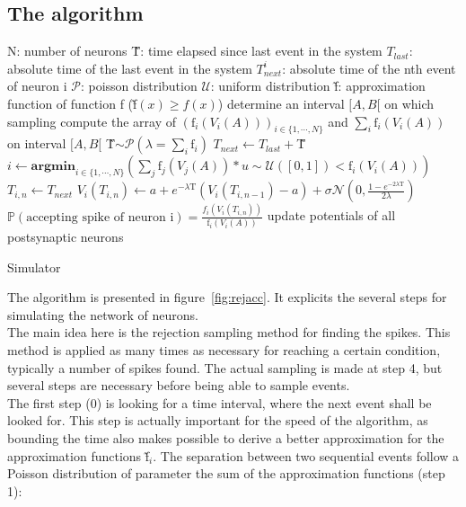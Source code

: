 \subsection{The algorithm}
	\begin{algorithm}
		\begin{algorithmic}[1]
			\State N: number of neurons
			\State \~T: time elapsed since last event in the system
			\State $T_{last}$: absolute time of the last event in the system
			\State $T_{next}^i$: absolute time of the nth event of neuron i
			\State $\mathscr{P}$: poisson distribution
			\State $\mathscr{U}$: uniform distribution
			\State \~f: approximation function of function f (\~f$(x)\ge f(x)$)
			\Repeat
				\Repeat{}
					\State determine an interval $[A,B[$ on which sampling
					\State compute the array of $(\text{\~f}_i(V_i(A)))_{i\in\{1,\cdots,N\}}$ and $\sum_i\text{\~f}_i(V_i(A))$ on interval $[A,B[$
					\State \~T$\sim\mathscr{P}(\lambda=\sum_i\text{\~f}_i)$
					\State $T_{next}\gets T_{last}+$\~T
				\State $i\gets\textbf{argmin}_{i\in\{1,\cdots,N\}}\left(\sum_j \text{\~f}_j(V_j(A)) * u\sim\mathscr{U}([0,1])<\text{\~f}_i(V_i(A))\right)$
				\State $T_{i,n}\gets T_{next}$
				\State $V_i(T_{i,n})\gets a+e^{-\lambda\text{\~T}}(V_i(T_{i,n-1})-a)+\sigma\mathscr{N}(0,\frac{1-e^{-2\lambda\text{\~T}}}{2\lambda})$
				\State $\mathbb{P}(\text{accepting spike of neuron i})=\frac{f_i(V_i(T_{i,n}))}{\text{\~f}_i(V_i(A))}$
					\State update potentials of all postsynaptic neurons
				\EndIf
		\end{algorithmic}
		\caption{Simulator}\label{alg:rejacc}
	\end{algorithm}
	\indent The algorithm is presented in figure~\ref{fig:rejacc}. It explicits the several steps for simulating the network of neurons.\\\indent
	The main idea here is the rejection sampling method for finding the spikes. This method is applied as many times as necessary for reaching a certain condition, typically a number of spikes found. The actual sampling is made at step 4, but several steps are necessary before being able to sample events.\\\indent
	The first step (0) is looking for a time interval, where the next event shall be looked for. This step is actually important for the speed of the algorithm, as bounding the time also makes possible to derive a better approximation for the approximation functions \~f$_i$. The separation between two sequential events follow a Poisson distribution of parameter the sum of the approximation functions (step 1):
